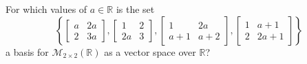 \documentclass{article}
\begin{document}
\setcounter{problem}{186}
\begin{problem}
For which values of $a \in \mathbb{R}$ is the set
\[
\left\{
\begin{bmatrix}
a	&	2a	\\
2	&	3a
\end{bmatrix}
,
\begin{bmatrix}
1	&	2	\\
2a	&	3
\end{bmatrix}
,
\begin{bmatrix}
1	&	2a	\\
a+1	&	a+2
\end{bmatrix}
,
\begin{bmatrix}
1	&	a+1	\\
2	&	2a+1
\end{bmatrix}
\right\}
\]
a basis for $\mathcal{M}_{2\times 2}\left( \mathbb{R} \right)$ as a vector space over $\mathbb{R}$?
\end{problem}
\end{document}
